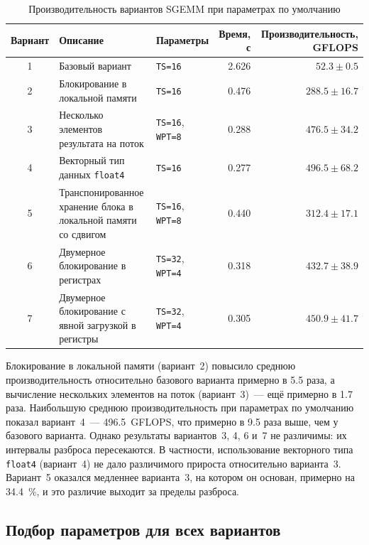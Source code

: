 \documentclass[a4paper]{article}
\begin{document}
\begin{table}[h!]
\centering
\caption{Производительность вариантов SGEMM при параметрах по умолчанию}
\label{tab:default}
\begin{tabular}{c >{\raggedright\arraybackslash}p{7.2cm} l r r}
\toprule
Вариант & Описание & Параметры & Время, с & Производительность, GFLOPS \\
\midrule
1 & Базовый вариант                                                & \texttt{TS=16}                 & 2.626 & $52.3 \pm 0.5$ \\
2 & Блокирование в локальной памяти                                & \texttt{TS=16}                 & 0.476 & $288.5 \pm 16.7$ \\
3 & Несколько элементов результата на поток                        & \texttt{TS=16}, \texttt{WPT=8} & 0.288 & $476.5 \pm 34.2$ \\
4 & Векторный тип данных \texttt{float4}                           & \texttt{TS=16}                 & 0.277 & $496.5 \pm 68.2$ \\
5 & Транспонированное хранение блока в локальной памяти со сдвигом & \texttt{TS=16}, \texttt{WPT=8} & 0.440 & $312.4 \pm 17.1$ \\
6 & Двумерное блокирование в регистрах                             & \texttt{TS=32}, \texttt{WPT=4} & 0.318 & $432.7 \pm 38.9$ \\
7 & Двумерное блокирование с явной загрузкой в регистры            & \texttt{TS=32}, \texttt{WPT=4} & 0.305 & $450.9 \pm 41.7$ \\
\bottomrule
\end{tabular}
\end{table}

Блокирование в локальной памяти (вариант~2) повысило среднюю
производительность относительно базового варианта примерно в 5.5 раза,
а вычисление нескольких элементов на поток (вариант~3)~--- ещё
примерно в 1.7 раза. Наибольшую среднюю производительность при
параметрах по умолчанию показал вариант~4~--- 496.5~GFLOPS, что
примерно в 9.5 раза выше, чем у базового варианта. Однако результаты
вариантов~3, 4, 6 и~7 не различимы: их интервалы разброса пересекаются.
В частности, использование векторного типа \texttt{float4} (вариант~4)
не дало различимого прироста относительно варианта~3. Вариант~5
оказался медленнее варианта~3, на котором он основан, примерно на
34.4~\%, и это различие выходит за пределы разброса.

\subsection{Подбор параметров для всех вариантов}
\label{sec:tuning}
\end{document}
